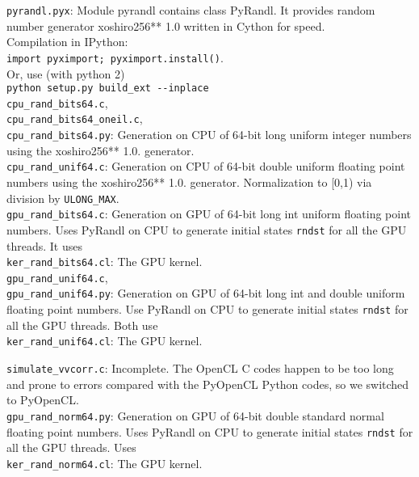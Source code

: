 \documentclass[preprint2]{aastex}
\begin{document}
\verb|pyrandl.pyx|: Module pyrandl contains class PyRandl. It provides random number generator
xoshiro256** 1.0 written in Cython for speed. \\

Compilation in IPython: \\
\verb|import pyximport; pyximport.install()|.\\
Or, use (with python 2) \\
\verb|python setup.py build_ext --inplace| \\


\verb|cpu_rand_bits64.c|, \\
\verb|cpu_rand_bits64_oneil.c|, \\ 
\verb|cpu_rand_bits64.py|: Generation on CPU of 64-bit long uniform integer numbers using the xoshiro256** 1.0. generator. \\

\verb|cpu_rand_unif64.c|: Generation on CPU of 64-bit double uniform floating point numbers using the xoshiro256** 1.0. generator. Normalization to [0,1) via division by \verb|ULONG_MAX|.\\


\verb|gpu_rand_bits64.c|: Generation on GPU of 64-bit long int uniform floating point numbers. Uses PyRandl on CPU to generate initial states \verb|rndst| for all the GPU threads. It uses \\
\verb|ker_rand_bits64.cl|: The GPU kernel.\\

\verb|gpu_rand_unif64.c|, \\
\verb|gpu_rand_unif64.py|: Generation on GPU of 64-bit long int and double uniform floating point numbers. Use PyRandl on CPU to generate initial states \verb|rndst| for all the GPU threads. Both use \\
\verb|ker_rand_unif64.cl|: The GPU kernel.

\verb|simulate_vvcorr.c|: Incomplete. The OpenCL C codes happen to be too long and prone to errors compared with the PyOpenCL Python codes, so we switched to PyOpenCL. \\

\verb|gpu_rand_norm64.py|: Generation on GPU of 64-bit double standard normal floating point numbers. Uses PyRandl on CPU to generate initial states \verb|rndst| for all the GPU threads. Uses \\
\verb|ker_rand_norm64.cl|: The GPU kernel. 
\end{document}
